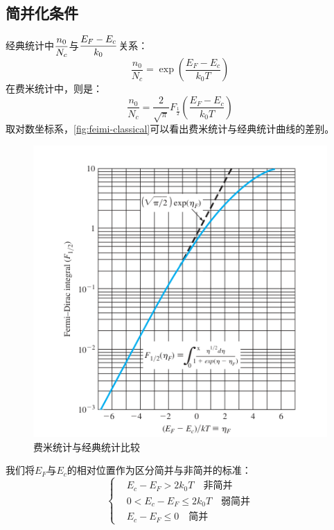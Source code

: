 \subsection{简并化条件}

经典统计中$\displaystyle \frac{n_0}{N_c}$与$\displaystyle \frac{E_F-E_c}{k_0}$关系：
\begin{equation}
    \frac{n_0}{N_c}=\exp{\left(\frac{E_F-E_c}{k_0T}\right)}
\end{equation}
在费米统计中，则是：
\begin{equation}
    \frac{n_0}{N_c}=\frac{2}{\sqrt{\pi}}F_\frac{1}{2}\left(\frac{E_F-E_c}{k_0T}\right)
\end{equation}
取对数坐标系，\autoref{fig:feimi-classical}可以看出费米统计与经典统计曲线的差别。
\begin{figure}
    \centering
    \includegraphics[width=0.8\linewidth]{feimi.png}
    \caption{费米统计与经典统计比较}
    \label{fig:feimi-classical}
\end{figure}
我们将$E_F$与$E_c$的相对位置作为区分简并与非简并的标准：
\begin{equation}
\left\{
\begin{aligned}
    &E_c-E_F>2k_0T \quad\text{非简并}\\
    &0<E_c-E_F\leq 2k_0T \quad\text{弱简并}\\
    &E_c-E_F\leq 0 \quad \text{简并}
\end{aligned}
\right.
\end{equation}



